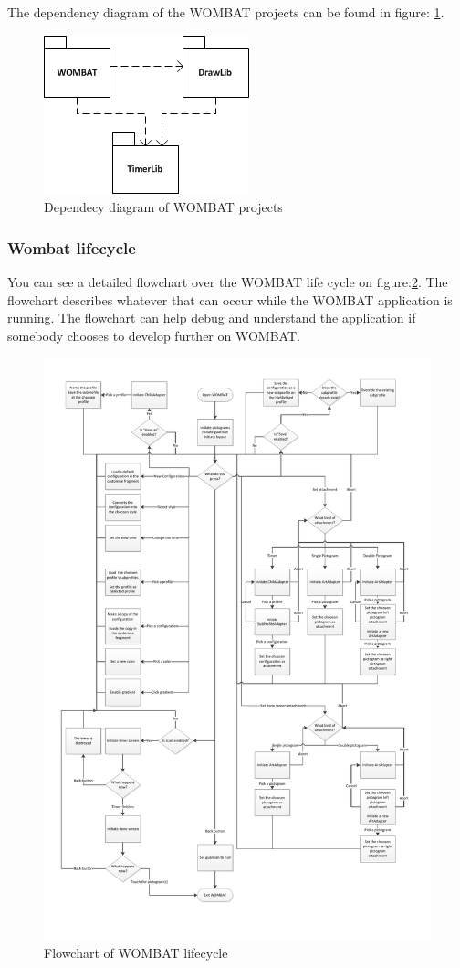 The dependency diagram of the WOMBAT projects can be found in figure: \ref{fig:LibraryDependency}.

\begin{figure}[H]
	\centering
		\includegraphics[scale=0.6]{Images/Implementation/LibraryDependency.png}
	\caption{Dependecy diagram of WOMBAT projects}
	\label{fig:LibraryDependency}
\end{figure}

\subsubsection{Wombat lifecycle}
You can see a detailed flowchart over the WOMBAT life cycle on figure:\ref{fig:wombatLifeCycle}. The flowchart describes whatever that can occur while the WOMBAT application is running. The flowchart can help debug and understand the application if somebody chooses to develop further on WOMBAT.

\begin{figure}[H]
	\centering
		\includegraphics[scale=0.6]{Images/Implementation/wombatLifeCycle.pdf}
	\caption{Flowchart of WOMBAT lifecycle}
	\label{fig:wombatLifeCycle}
\end{figure}